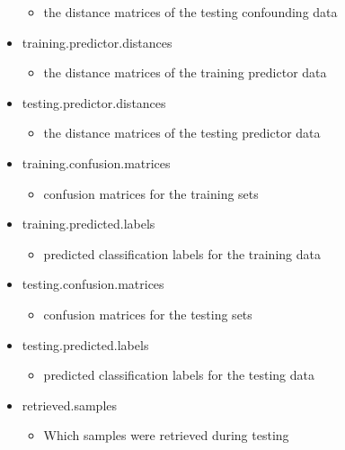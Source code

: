 \documentclass[
]{article}
\providecommand{\tightlist}{%
  \setlength{\itemsep}{0pt}\setlength{\parskip}{0pt}}
\begin{document}
\begin{itemize}
  \begin{itemize}
  \tightlist
  \item
    the distance matrices of the testing confounding data
  \end{itemize}
\item
  training.predictor.distances

  \begin{itemize}
  \tightlist
  \item
    the distance matrices of the training predictor data
  \end{itemize}
\item
  testing.predictor.distances

  \begin{itemize}
  \tightlist
  \item
    the distance matrices of the testing predictor data
  \end{itemize}
\item
  training.confusion.matrices

  \begin{itemize}
  \tightlist
  \item
    confusion matrices for the training sets
  \end{itemize}
\item
  training.predicted.labels

  \begin{itemize}
  \tightlist
  \item
    predicted classification labels for the training data
  \end{itemize}
\item
  testing.confusion.matrices

  \begin{itemize}
  \tightlist
  \item
    confusion matrices for the testing sets
  \end{itemize}
\item
  testing.predicted.labels

  \begin{itemize}
  \tightlist
  \item
    predicted classification labels for the testing data
  \end{itemize}
\item
  retrieved.samples

  \begin{itemize}
  \tightlist
  \item
    Which samples were retrieved during testing
  \end{itemize}
\end{itemize}
\end{document}
